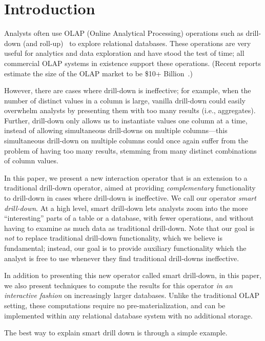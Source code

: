 

\section{Introduction}
Analysts often use OLAP (Online Analytical Processing) operations
such as drill-down (and roll-up)~\cite{export:69578} to explore
relational databases. 
These operations are very useful for analytics and data exploration and have stood the test of time;
all commercial OLAP systems 
in existence support these operations. (Recent reports estimate the size of the OLAP market to be \$10+ Billion~\cite{gartner}.)


However, there are cases where drill-down is ineffective; 
for example, when the number of distinct values
in a column is large, vanilla drill-down 
could easily overwhelm analysts by presenting them with too many 
results (i.e., aggregates). 
Further, drill-down only allows us to instantiate values
 one column at a time, instead of allowing simultaneous drill-downs
on multiple columns---this simultaneous drill-down on multiple columns 
could once again suffer from the problem
of having too many results, stemming from many distinct combinations of column values.

In this paper, we present a new interaction operator 
that is an extension to a traditional 
drill-down operator, aimed at providing {\em complementary}
functionality to drill-down in cases where drill-down is
ineffective. We call our operator {\em smart drill-down}.
At a high level, smart drill-down lets analysts zoom into
the more ``interesting'' parts of a table or a database,
with fewer operations, and without having to examine as much
data as traditional drill-down.
Note that our goal is {\em not} to replace traditional 
drill-down functionality, which we believe is fundamental;
instead, our goal is to provide auxiliary functionality 
which the analyst is free to use whenever they find 
traditional drill-downs ineffective.

In addition to presenting this new operator called smart drill-down, in this paper, 
we also present techniques to compute the results for this
operator {\em in an interactive fashion} on increasingly larger databases. 
Unlike the traditional OLAP setting, these computations 
require no pre-materialization, and can be implemented 
within any relational database system with no additional storage.



The best way to explain smart drill down is through a simple example.

